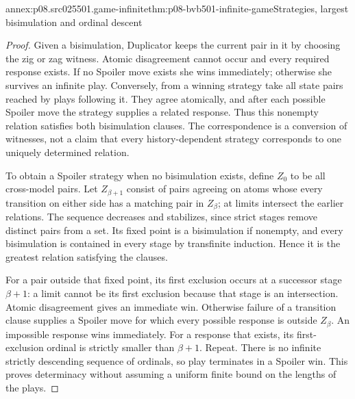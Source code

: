 \begin{annexitem}{annex:p08.src025501.game-infinite}{thm:p08-bvb501-infinite-game}{Strategies, largest bisimulation and ordinal descent}
\begin{proof}
Given a bisimulation, Duplicator keeps the current pair in it by choosing
the zig or zag witness. Atomic disagreement cannot occur and every required
response exists. If no Spoiler move exists she wins immediately; otherwise
she survives an infinite play. Conversely, from a winning strategy take
all state pairs reached by plays following it. They agree atomically,
and after each possible Spoiler move the strategy supplies a related
response. Thus this nonempty relation satisfies both bisimulation clauses.
The correspondence is a conversion of witnesses, not a claim that every
history-dependent strategy corresponds to one uniquely determined relation.

To obtain a Spoiler strategy when no bisimulation exists, define \(Z_0\)
to be all cross-model pairs. Let \(Z_{\beta+1}\) consist of pairs
agreeing on atoms whose every transition on either side has a matching
pair in \(Z_\beta\); at limits intersect the earlier relations.
The sequence decreases and stabilizes, since strict stages remove distinct
pairs from a set. Its fixed point is a bisimulation if nonempty, and every
bisimulation is contained in every stage by transfinite induction. Hence
it is the greatest relation satisfying the clauses.

For a pair outside that fixed point, its first exclusion occurs at a
successor stage \(\beta+1\): a limit cannot be its first exclusion
because that stage is an intersection. Atomic disagreement gives an
immediate win. Otherwise failure of a transition clause supplies a Spoiler
move for which every possible response is outside \(Z_\beta\).
An impossible response wins immediately. For a response that exists, its
first-exclusion ordinal is strictly smaller than \(\beta+1\).
Repeat. There is no infinite strictly descending sequence of ordinals,
so play terminates in a Spoiler win. This proves determinacy without
assuming a uniform finite bound on the lengths of the plays.
\end{proof}
\end{annexitem}

